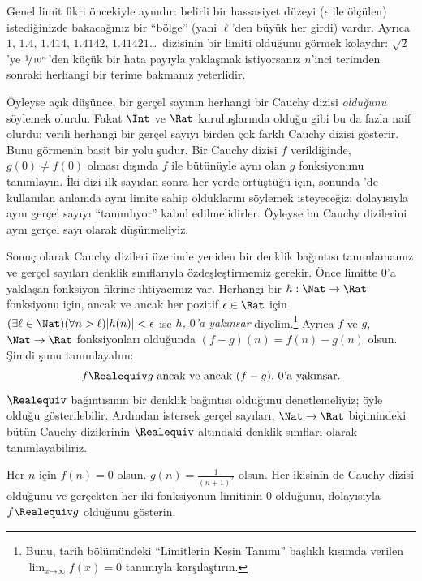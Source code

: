 \documentclass[../../../include/open-logic-section]{subfiles}
\begin{document}
Genel limit fikri öncekiyle aynıdır: belirli bir hassasiyet düzeyi
($\epsilon$ ile ölçülen) istediğinizde bakacağınız bir “bölge” (yani
$\ell$'den büyük her girdi) vardır. Ayrıca $1$, $1.4$, $1.414$, $1.4142$,
$1.41421$\ldots\ dizisinin bir limiti olduğunu görmek kolaydır:
$\sqrt{2}$'ye $\nicefrac{1}{10^{n}}$'den küçük bir hata payıyla yaklaşmak
istiyorsanız $n$'inci terimden sonraki herhangi bir terime bakmanız yeterlidir.

Öyleyse açık düşünce, bir gerçel sayının herhangi bir Cauchy dizisi
\emph{olduğunu} söylemek olurdu. Fakat $\Int$ ve $\Rat$ kuruluşlarında olduğu
gibi bu da fazla naif olurdu: verili herhangi bir gerçel sayıyı birden çok
farklı Cauchy dizisi gösterir. Bunu görmenin basit bir yolu şudur. Bir Cauchy
dizisi $f$ verildiğinde, $g(0)\neq f(0)$ olması dışında $f$ ile bütünüyle aynı
olan $g$ fonksiyonunu tanımlayın. İki dizi ilk sayıdan sonra her yerde
örtüştüğü için, sonunda 'de kullanılan anlamda aynı
limite sahip olduklarını söylemek isteyeceğiz; dolayısıyla aynı gerçel sayıyı
“tanımlıyor” kabul edilmelidirler. Öyleyse bu Cauchy dizilerini aynı gerçel sayı
olarak düşünmeliyiz.

Sonuç olarak Cauchy dizileri üzerinde yeniden bir denklik bağıntısı
tanımlamamız ve gerçel sayıları denklik sınıflarıyla özdeşleştirmemiz gerekir.
Önce limitte $0$'a yaklaşan fonksiyon fikrine ihtiyacımız var. Herhangi bir
$h : \Nat \to \Rat$ fonksiyonu için, ancak ve ancak her pozitif
$\epsilon \in \Rat$ için
$(\exists \ell \in \Nat)(\forall n > \ell)|h(n)| < \epsilon$ ise
\emph{$h$, $0$'a yakınsar} diyelim.\footnote{Bunu, tarih bölümündeki
“Limitlerin Kesin Tanımı” başlıklı kısımda verilen
$\lim_{x \mathord{\rightarrow}\infty}f(x) = 0$ tanımıyla karşılaştırın.}
Ayrıca $f$ ve $g$, $\Nat \to \Rat$ fonksiyonları olduğunda
$(f-g)(n) = f(n) - g(n)$ olsun. Şimdi şunu tanımlayalım:
\[
	f \Realequiv g \text{ ancak ve ancak $(f-g)$, $0$'a yakınsar.}
\]
$\Realequiv$ bağıntısının bir denklik bağıntısı olduğunu denetlemeliyiz; öyle
olduğu gösterilebilir. Ardından istersek gerçel sayıları, $\Nat \to \Rat$
biçimindeki bütün Cauchy dizilerinin $\Realequiv$ altındaki denklik sınıfları olarak
tanımlayabiliriz.

\begin{prob}
Her $n$ için $f(n) = 0$ olsun. $g(n) = \frac{1}{(n+1)^2}$ olsun. Her ikisinin
de Cauchy dizisi olduğunu ve gerçekten her iki fonksiyonun limitinin $0$
olduğunu, dolayısıyla $f \Realequiv g$ olduğunu gösterin.
\end{prob}
\end{document}
